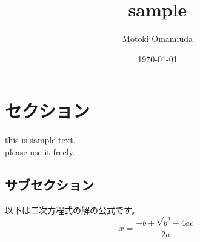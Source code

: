 \documentclass{article}
\title{sample}
\author{Motoki Omamiuda}
\date{\today}
\begin{document}
\maketitle
\section{セクション}
this is sample text.\\
please use it freely.
\subsection{サブセクション}
以下は二次方程式の解の公式です。
\[ x = \frac{-b \pm \sqrt{b^2 - 4ac}}{2a} \]
\end{document}
